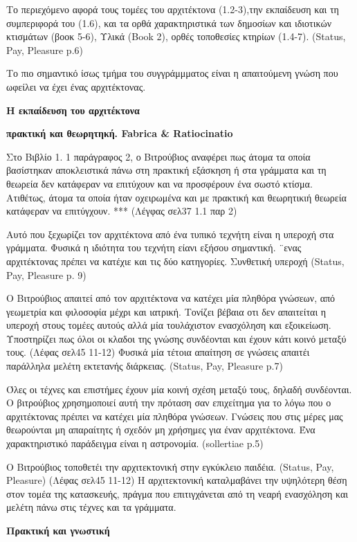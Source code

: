 Το περιεχόμενο αφορά τους τομέες του αρχιτέκτονα (1.2-3),την εκπαίδευση και τη
συμπεριφορά του (1.6), και τα ορθά χαρακτηριστικά των δημοσίων και ιδιοτικών
κτισμάτων (βοοκ 5-6), Υλικά (Book 2), ορθές τοποθεσίες κτηρίων (1.4-7). (Status,
Pay, Pleasure p.6)

Το πιο σημαντικό ίσως τμήμα του συγγράμμματος είναι η απαιτούμενη γνώση που
ωφείλει να έχει ένας αρχιτέκτονας.

\textbf{ Η εκπαίδευση του αρχιτέκτονα}

\textbf{πρακτική και θεωρητηκή. Fabrica \& Ratiocinatio}

Στο Βιβλίο 1. 1 παράγραφος 2, ο Βιτρούβιος αναφέρει πως άτομα τα οποία
βασίστηκαν αποκλειστικά πάνω στη πρακτική εξάσκηση ή  στα γράμματα και τη
θεωρεία δεν κατάφεραν να επιτύχουν και να προσφέρουν ένα σωστό κτίσμα. Ατιθέτως,
άτομα τα οποία ήταν οχειρωμένα και με πρακτική και θεωρητικιή θεωρεία κατάφεραν
να επιτύγχουν. *** (Λέγφας σελ37 1.1 παρ 2)

Αυτό που ξεχωρίζει τον αρχιτέκτονα από ένα τυπικό τεχνήτη είναι η υπεροχή στα
γράμματα. Φυσικά η ιδιότητα του τεχνήτη είανι εξήσου σημαντική. ¨ενας
αρχιτέκτονας πρέπει να κατέχιε και τις δύο κατηγορίες. Συνθετική υπεροχή
(Status, Pay, Pleasure p. 9)

Ο Βιτρούβιος απαιτεί από τον αρχιτέκτονα να κατέχει μία πληθόρα γνώσεων, από
γεωμετρία και φιλοσοφία μέχρι και ιατρική. Τονίζει βέβαια οτι δεν απαιτείται η
υπεροχή στους τομέες αυτούς αλλά μία τουλάχιστον ενασχόληση και εξοικείωση.
Υποστηρίζει πως όλοι οι κλαδοι της γνώσης συνδέονται και έχουν κάτι κοινό μεταξύ
τους. (Λέφας σελ45 11-12)
 Φυσικά μία τέτοια απαίτηση σε γνώσεις απαιτέι
παράλληλα μελέτη εκτετανής διάρκειας. (Status, Pay, Pleasure p.7)

Όλες οι τέχνες και επιστήμες έχουν μία κοινή σχέση μεταξύ τους, δηλαδή
συνδέονται. Ο βιτρούβιος χρησημοποιεί αυτή την πρόταση σαν επιχείτημα για το
λόγω που ο αρχιτέκτονας πρέιπει να κατέχει μία πληθόρα γνώσεων. Γνώσεις που στις
μέρες μας θεωρούνται μη απαραίτητς ή σχεδόν μη χρήσημες για έναν αρχιτέκτονα.
Ένα χαρακτηριστικό παράδειγμα είναι η αστρονομία. (sollertiae p.5)

Ο Βιτρούβιος τοποθετέι την αρχιτεκτονική στην εγκύκλειο παιδέια. (Status, Pay,
Pleasure) (Λέφας σελ45 11-12)
 Η αρχιτεκτονική καταλμαβάνει την υψηλότερη θέση
στον τομέα της κατασκευής, πράγμα που επιτιγχάνεται από τη νεαρή ενασχόληση και
μελέτη πάνω στις τέχνες και τα γράμματα.

\textbf{Πρακτική και γνωστική}

